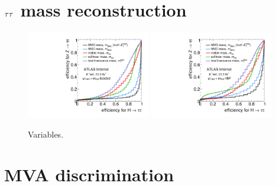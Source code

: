 \section{$\tau\tau$ mass reconstruction}
\label{sec:strategy-mtautau}

\begin{figure}[tp]
  \centering
  \includegraphics[width=0.48\textwidth]{figures/mtautau/mtautau-ROC-boost}
  \includegraphics[width=0.48\textwidth]{figures/mtautau/mtautau-ROC-vbf}
  \caption{Variables.}
  \label{fig:strategy-mtautau-ROC}
\end{figure}

\section{MVA discrimination}
\label{sec:strategy-mva}

